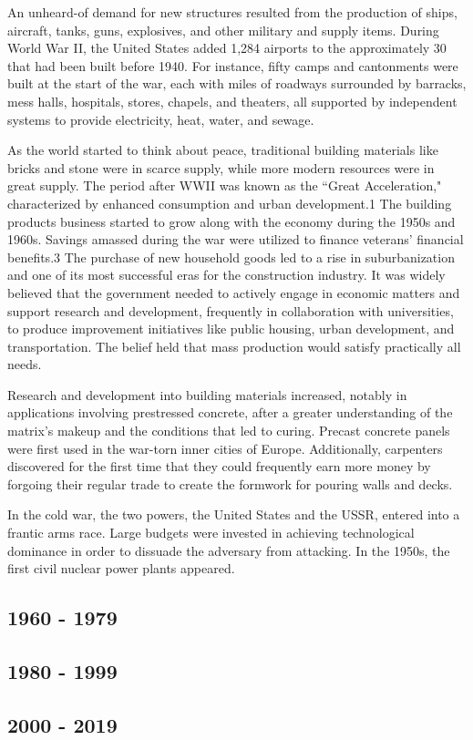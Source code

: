 An unheard-of demand for new structures resulted from the production of ships, aircraft, tanks, guns, explosives, and other military and supply items. During World War II, the United States added 1,284 airports to the approximately 30 that had been built before 1940. For instance, fifty camps and cantonments were built at the start of the war, each with miles of roadways surrounded by barracks, mess halls, hospitals, stores, chapels, and theaters, all supported by independent systems to provide electricity, heat, water, and sewage.

As the world started to think about peace, traditional building materials like bricks and stone were in scarce supply, while more modern resources were in great supply. The period after WWII was known as the “Great Acceleration," characterized by enhanced consumption and urban development.1 The building products business started to grow along with the economy during the 1950s and 1960s. Savings amassed during the war were utilized to finance veterans' financial benefits.3 The purchase of new household goods led to a rise in suburbanization and one of its most successful eras for the construction industry. It was widely believed that the government needed to actively engage in economic matters and support research and development, frequently in collaboration with universities, to produce improvement initiatives like public housing, urban development, and transportation. The belief held that mass production would satisfy practically all needs. 

Research and development into building materials increased, notably in applications involving prestressed concrete, after a greater understanding of the matrix's makeup and the conditions that led to curing. Precast concrete panels were first used in the war-torn inner cities of Europe. Additionally, carpenters discovered for the first time that they could frequently earn more money by forgoing their regular trade to create the formwork for pouring walls and decks.

In the cold war, the two powers, the United States and the USSR, entered into a frantic arms race. Large budgets were invested in achieving technological dominance in order to dissuade the adversary from attacking. In the 1950s, the first civil nuclear power plants appeared.

\subsection{1960 - 1979}
\label{sec:1900-1919}

\subsection{1980 - 1999}
\label{sec:1900-1919}

\subsection{2000 - 2019}
\label{sec:1900-1919}





